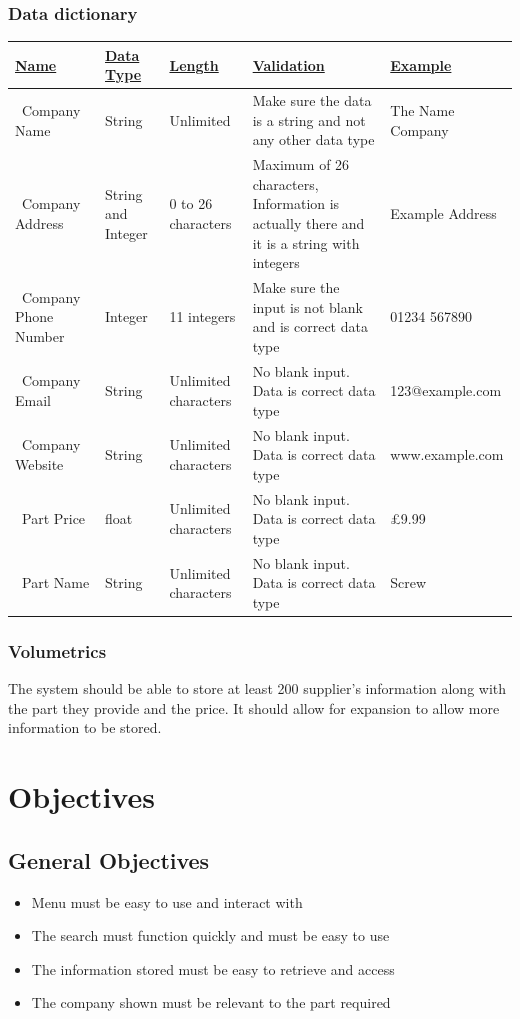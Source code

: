 \subsubsection{Data dictionary}
\begin{center}
\begin{tabular}{ | m{3cm} | m{2cm} | m{2cm} | m{3cm} | m{3cm} | } 
\hline
\underline{\bf Name}& \bf\underline{Data Type} & \bf\underline{Length} & \bf\underline{Validation} & \bf\underline{Example}

\\
\hline
\ Company Name & String & Unlimited & Make sure the data is a string and not any other data type & The Name Company\\ 
\hline
\ Company Address & String and Integer & 0 to 26 characters & Maximum of 26 characters, Information is actually there and it is a string with integers & Example Address\\
\hline
\ Company Phone Number & Integer & 11 integers & Make sure the input is not blank and is correct data type & 01234 567890\\
\hline
\ Company Email & String & Unlimited characters & No blank input. Data is correct data type & 123@example.com\\
\hline
\ Company Website & String & Unlimited characters & No blank input. Data is correct data type & www.example.com\\
\hline
\ Part Price & float & Unlimited characters & No blank input. Data is correct data type & £9.99\\
\hline
\ Part Name & String & Unlimited characters & No blank input. Data is correct data type & Screw\\
\hline
\end{tabular}
\end{center}
\subsubsection{Volumetrics}
The system should be able to store at least 200 supplier's information along with the part they provide and the price. It should allow for expansion to allow more information to be stored. 

\section{Objectives}

\subsection{General Objectives}
\begin{itemize}
	\item Menu must be easy to use and interact with
	\item The search must function quickly and must be easy to use
	\item The information stored must be easy to retrieve and access
	\item The company shown must be relevant to the part required
\end{itemize}

